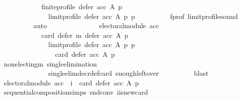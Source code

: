 \begin{isabellebody}
\ \ \ \ \ \ \ \ \ \ \ \ finite{\isacharunderscore}{\kern0pt}profile\ {\isacharparenleft}{\kern0pt}defer\ acc\ A\ p{\isacharparenright}{\kern0pt}\isanewline
\ \ \ \ \ \ \ \ \ \ \ \ \ \ {\isacharparenleft}{\kern0pt}limit{\isacharunderscore}{\kern0pt}profile\ {\isacharparenleft}{\kern0pt}defer\ acc\ A\ p{\isacharparenright}{\kern0pt}\ p{\isacharparenright}{\kern0pt}{\isachardoublequoteclose}\isanewline
\ \ \ \ \ \ \ \ \isamarkupfalse%
\ f{\isacharunderscore}{\kern0pt}prof\ limit{\isacharunderscore}{\kern0pt}profile{\isacharunderscore}{\kern0pt}sound\isanewline
\ \ \ \ \ \ \ \ \isamarkupfalse%
\ auto\isanewline
\ \ \ \ \ \ \isamarkupfalse%
\isanewline
\ \ \ \ \ \ \ \ {\isachardoublequoteopen}electoral{\isacharunderscore}{\kern0pt}module\ acc\ {\isasymlongrightarrow}\isanewline
\ \ \ \ \ \ \ \ \ \ \ \ card\ {\isacharparenleft}{\kern0pt}defer\ m\ {\isacharparenleft}{\kern0pt}defer\ acc\ A\ p{\isacharparenright}{\kern0pt}\isanewline
\ \ \ \ \ \ \ \ \ \ \ \ \ \ {\isacharparenleft}{\kern0pt}limit{\isacharunderscore}{\kern0pt}profile\ {\isacharparenleft}{\kern0pt}defer\ acc\ A\ p{\isacharparenright}{\kern0pt}\ p{\isacharparenright}{\kern0pt}{\isacharparenright}{\kern0pt}\ {\isacharequal}{\kern0pt}\isanewline
\ \ \ \ \ \ \ \ \ \ \ \ \ \ \ \ card\ {\isacharparenleft}{\kern0pt}defer\ acc\ A\ p{\isacharparenright}{\kern0pt}\ {\isacharminus}{\kern0pt}\ {}{\isachardoublequoteclose}\isanewline
\ \ \ \ \ \ \ \ \isamarkupfalse%
\ non{\isacharunderscore}{\kern0pt}electing{\isacharunderscore}{\kern0pt}m\ single{\isacharunderscore}{\kern0pt}elimination\isanewline
\ \ \ \ \ \ \ \ \ \ \ \ \ \ single{\isacharunderscore}{\kern0pt}elim{\isacharunderscore}{\kern0pt}decr{\isacharunderscore}{\kern0pt}def{\isacharunderscore}{\kern0pt}card{}\ enough{\isacharunderscore}{\kern0pt}leftover\isanewline
\ \ \ \ \ \ \ \ \isamarkupfalse%
\ blast\isanewline
\ \ \ \ \ \ \isamarkupfalse%
\ {\isachardoublequoteopen}electoral{\isacharunderscore}{\kern0pt}module\ acc\ {\isasymlongrightarrow}\ i\ {\isacharequal}{\kern0pt}\ card\ {\isacharparenleft}{\kern0pt}defer\ acc\ A\ p{\isacharparenright}{\kern0pt}\ {\isacharminus}{\kern0pt}\ {}{\isachardoublequoteclose}\isanewline
\ \ \ \ \ \ \ \ \isamarkupfalse%
\ sequential{\isacharunderscore}{\kern0pt}composition{\isachardot}{\kern0pt}simps\ snd{\isacharunderscore}{\kern0pt}conv\ i{\isacharunderscore}{\kern0pt}is{\isacharunderscore}{\kern0pt}new{\isacharunderscore}{\kern0pt}card\isanewline
\ \ \ \ \ \ \ \ \isamarkupfalse%

\end{isabellebody}
